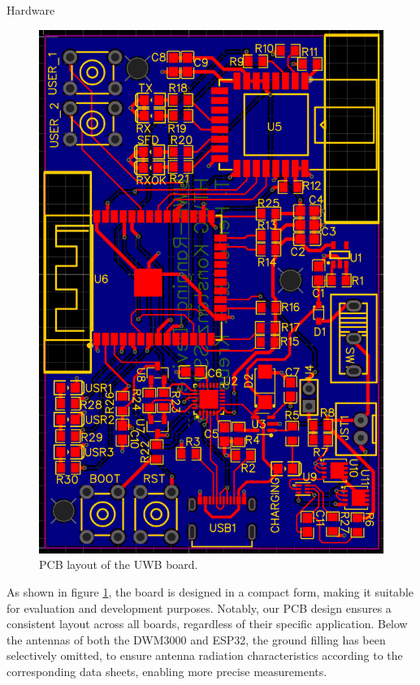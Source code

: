 \documentclass[final]{beamer}
\newlength{\colwidth}
\begin{document}
\begin{frame}[t]
\begin{columns}[t]
\begin{column}{\colwidth}
\begin{block}{Hardware}
  \begin{figure}[hbt!]
    \centering
    \includegraphics[scale=0.60, angle=90]{pics/pcb_design.png}
    \caption{PCB layout of the UWB board.}
    \label{fig:pcb}
  \end{figure}

  As shown in figure \ref{fig:pcb}, the board is designed in a compact form,
  making it suitable for evaluation and development purposes.
  Notably, our PCB design ensures a consistent layout across all boards, regardless of their specific application.
  Below the antennas of both the DWM3000 and ESP32, the ground filling has been selectively omitted, to ensure antenna radiation characteristics according to the corresponding data sheets, enabling more precise measurements.
  \end{block}
\end{column}


\end{columns}
\end{frame}
\end{document}
